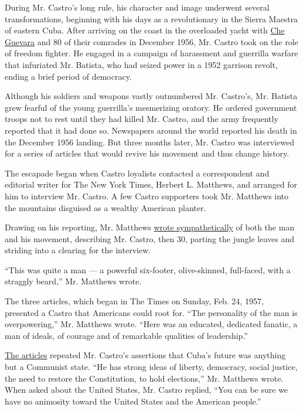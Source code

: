 During Mr. Castro's long rule, his character and image underwent several
transformations, beginning with his days as a revolutionary in the
Sierra Maestra of eastern Cuba. After arriving on the coast in the
overloaded yacht with
\href{http://timesmachine.nytimes.com/timesmachine/1967/10/11/80715565.html?pageNumber=18\&rpm=true}{Che
Guevara} and 80 of their comrades in December 1956, Mr. Castro took on
the role of freedom fighter. He engaged in a campaign of harassment and
guerrilla warfare that infuriated Mr. Batista, who had seized power in a
1952 garrison revolt, ending a brief period of democracy.

Although his soldiers and weapons vastly outnumbered Mr. Castro's, Mr.
Batista grew fearful of the young guerrilla's mesmerizing oratory. He
ordered government troops not to rest until they had killed Mr. Castro,
and the army frequently reported that it had done so. Newspapers around
the world reported his death in the December 1956 landing. But three
months later, Mr. Castro was interviewed for a series of articles that
would revive his movement and thus change history.

The escapade began when Castro loyalists contacted a correspondent and
editorial writer for The New York Times, Herbert L. Matthews, and
arranged for him to interview Mr. Castro. A few Castro supporters took
Mr. Matthews into the mountains disguised as a wealthy American planter.

Drawing on his reporting, Mr. Matthews
\href{http://www.nytimes.com/packages/html/books/matthews/matthews022457.pdf}{wrote
sympathetically} of both the man and his movement, describing Mr.
Castro, then 30, parting the jungle leaves and striding into a clearing
for the interview.

``This was quite a man --- a powerful six-footer, olive-skinned,
full-faced, with a straggly beard,'' Mr. Matthews wrote.

The three articles, which began in The Times on Sunday, Feb. 24, 1957,
presented a Castro that Americans could root for. ``The personality of
the man is overpowering,'' Mr. Matthews wrote. ``Here was an educated,
dedicated fanatic, a man of ideals, of courage and of remarkable
qualities of leadership.''

\href{http://timesmachine.nytimes.com/timesmachine/1959/03/08/89158388.html?pageNumber=288\&rpm=true\&zoom=16}{The
articles} repeated Mr. Castro's assertions that Cuba's future was
anything but a Communist state. ``He has strong ideas of liberty,
democracy, social justice, the need to restore the Constitution, to hold
elections,'' Mr. Matthews wrote. When asked about the United States, Mr.
Castro replied, ``You can be sure we have no animosity toward the United
States and the American people.''

